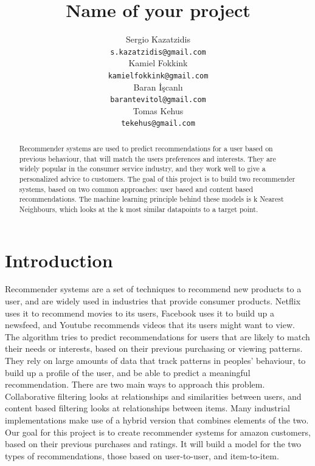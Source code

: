 \documentclass[11pt]{article}
\title{Name of your project}
\author{Sergio Kazatzidis \\
    {\tt s.kazatzidis@gmail.com} \\
    Kamiel Fokkink \\
    {\tt kamielfokkink@gmail.com} \\\And
    Baran İşcanlı \\
    {\tt barantevitol@gmail.com} \\
    Tomas Kehus \\
    {\tt tekehus@gmail.com}}
\date{}
\begin{document}
\maketitle
\begin{abstract}
    Recommender systems are used to predict recommendations for a user based on previous behaviour, that will match the users preferences and interests. They are widely popular in the consumer service industry, and they work well to give a personalized advice to customers. The goal of this project is to build two recommender systems, based on two common approaches: user based and content based recommendations. The machine learning principle behind these models is k Nearest Neighbours, which looks at the k most similar datapoints to a target point.
\end{abstract}

\noindent

\section{Introduction}
Recommender systems are a set of techniques to recommend new products to a user, and are widely used in industries that provide consumer products. Netflix uses it to recommend movies to its users, Facebook uses it to build up a newsfeed, and Youtube recommends videos that its users might want to view. The algorithm tries to predict recommendations for users that are likely to match their needs or interests, based on their previous purchasing or viewing patterns. They rely on large amounts of data that track patterns in peoples' behaviour, to build up a profile of the user, and be able to predict a meaningful recommendation. There are two main ways to approach this problem. Collaborative filtering looks at relationships and similarities between users, and content based filtering looks at relationships between items. Many industrial implementations make use of a hybrid version that combines elements of the two. Our goal for this project is to create recommender systems for amazon customers, based on their previous purchases and ratings. It will build a model for the two types of recommendations, those based on user-to-user, and item-to-item. \\
\end{document}
